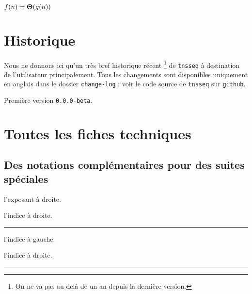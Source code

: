 \documentclass[12pt,a4paper]{article}
\theoremstyle{definition}
\newcommand\separation{
	\medskip
	\hfill\rule{0.5\textwidth}{0.75pt}\hfill
	\medskip
}
\begin{document}
\begin{latexex}
$f(n) = \bigtheta{g(n)}$
\end{latexex}


\newpage

\section{Historique}

Nous ne donnons ici qu'un très bref historique récent
\footnote{
	On ne va pas au-delà de un an depuis la dernière version.
}
de \verb+tnsseq+ à destination de l'utilisateur principalement.
Tous les changements sont disponibles uniquement en anglais dans le dossier \verb+change-log+ : voir le code source de \verb+tnsseq+ sur \verb+github+.

\begin{description}

    \medskip
    \item[2020-07-10] Première version \verb+0.0.0-beta+.

\end{description}


\newpage
\section{Toutes les fiches techniques} \label{techincal-ids}









\subsection{Des notations complémentaires pour des suites spéciales}




 l'exposant à droite.

 l'indice à droite.


\separation



 l'indice à gauche.

 l'indice à droite.


\separation


\end{document}
